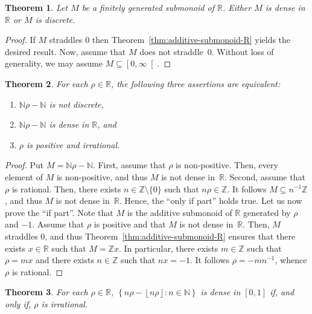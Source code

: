 \documentclass[12pt]{article}
\newcommand{\bZ}{\mathbb{Z}}
\newcommand{\bN}{\mathbb{N}} %
\newcommand{\bR}{\mathbb{R}}
\newcommand{\Rnneg}{\left[0, \infty\right[} %
\newcommand{\floor}[1]{\left\lfloor #1  \right\rfloor}
\newtheorem{theorem}{Theorem}
\theoremstyle{definition}
\begin{document}
\begin{theorem}
  Let $M$ be a finitely generated submonoid of $\bR$.
  Either $M$ is dense in $\bR$ or $M$ is discrete.
\end{theorem}

\begin{proof}
  If $M$ straddles $0$ then Theorem~\ref{thm:additive-submonoid-R} yields the desired result.
  Now, assume that $M$ does not straddle~$0$.
  Without loss of generality, we may assume $M \subseteq \Rnneg$.
  
\end{proof}

 \begin{theorem} \label{thm:Nr-N}
   For each $\rho \in \bR$,
   the following three assertions are equivalent:
     \begin{enumerate}
     \item $\bN \rho - \bN$ is not discrete, \label{ass:Nr-N:discrete}
     \item $\bN \rho - \bN$ is dense in $\bR$, and  \label{ass:Nr-N:dense}
    \item  $\rho$ is positive and irrational. \label{ass:Nr-N:irrational}
    \end{enumerate} 
\end{theorem}

\begin{proof}
  Put $M = \bN \rho - \bN$.
  First, assume that $\rho$ is non-positive.
  Then, every element of $M$ is non-positive, and thus $M$ is not dense in~$\bR$.
  Second, assume that $\rho$ is rational.
  Then, there exists $n \in \bZ \setminus \{ 0 \}$ such that $n \rho \in \bZ$.
  It follows $M \subseteq n^{-1} \bZ$, and thus $M$ is not dense in~$\bR$.
  Hence, the ``only if part'' holds true.
  Let us now prove the ``if part''.
  Note that $M$ is the additive submonoid of $\bR$ generated by $\rho$ and $- 1$.
  Assume that $\rho$ is positive and that $M$ is not dense in~$\bR$.
  Then, $M$ straddles $0$,
  and thus Theorem~\ref{thm:additive-submonoid-R} ensures that there exists $x \in \bR$ such that $M = \bZ x$.
  In particular, there exists $m \in \bZ$ such that $\rho = m x$ and there exists $n \in \bZ$ such that $n x = - 1$.
  It follows $\rho = - m n^{-1}$, whence $\rho$ is rational.
\end{proof}

\begin{theorem}
  For each $\rho \in \bR$,
   $\left\{ n \rho - \floor{n \rho} : n \in \bN \right\}$ is dense in $[0, 1]$ if, and only if,
   $\rho$ is irrational.
 \end{theorem}
\end{document}
